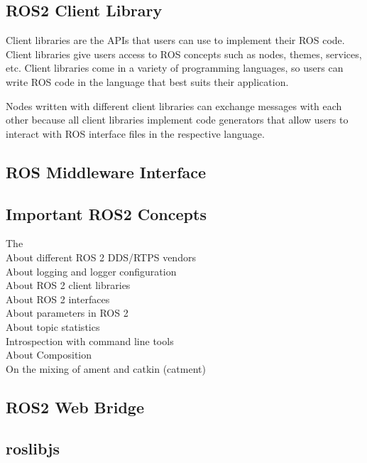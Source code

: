 	\subsection{ROS2 Client Library}
	\label{Grundlagen:ROS2:ROS2ClientLibrary}
	Client libraries are the APIs that users can use to implement their ROS code. Client libraries give users access to ROS concepts such as nodes, themes, services, etc. Client libraries come in a variety of programming languages, so users can write ROS code in the language that best suits their application.

	Nodes written with different client libraries can exchange messages with each other because all client libraries implement code generators that allow users to interact with ROS interface files in the respective language.

	\subsection{ROS Middleware Interface}
	\label{Grundlagen:ROS2:ROSMiddlewareInterface}

	
	\subsection{Important ROS2 Concepts}
	\label{Grundlagen:ROS2:Concepts}

		
		The \\
		About different ROS 2 DDS/RTPS vendors\\	
		About logging and logger configuration\\
		About ROS 2 client libraries\\
		About ROS 2 interfaces\\
		About parameters in ROS 2\\
		About topic statistics\\
		Introspection with command line tools\\
		About Composition\\
		On the mixing of ament and catkin (catment)\\

	\subsection{ROS2 Web Bridge}
	\label{Grundlagen:ROS2:2WebBridge}
		
	\subsection{roslibjs}
	\label{Grundlagen:ROS2:RosLibJS}
	
